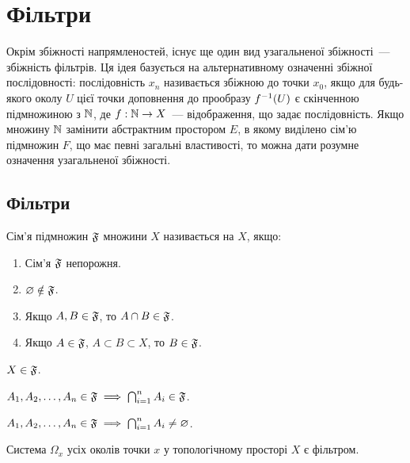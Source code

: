\chapter{Фільтри}

Окрім збіжності напрямленостей, існує ще один вид узагальненої збіжності~--- збіжність фільтрів. Ця ідея базується на альтернативному означенні збіжної послідовності: послідовність $x_n$ називається збіжною до точки $x_0$, якщо для будь-якого околу $U$ цієї точки доповнення до прообразу $f\inv (U)$ є скінченною підмножиною з $\NN$, де $f: \NN \to X$~--- відображення, що задає послідовність. Якщо множину $\NN$ замінити абстрактним простором $E$, в якому виділено сім'ю підмножин $F$, що має певні загальні властивості, то можна дати розумне означення узагальненої збіжності.

\section{Фільтри}

\begin{definition}
    Сім'я підмножин $\frak F$ множини $X$ називається  на $X$, якщо:
    \begin{enumerate}
        \item Сім'я $\frak F$ непорожня.
        \item $\emptyset \notin \frak F$.
        \item Якщо $A, B \in \frak F$, то $A \cap B \in \frak F$.
        \item Якщо $A \in \frak F$, $A \subset B \subset X$, то $B \in \frak F$.
    \end{enumerate}
\end{definition}

\begin{corollary}
    $X \in \frak F$.
\end{corollary}

\begin{corollary}
    $A_1, A_2, \dots, A_n \in \frak F \implies \bigcap_{i = 1}^n A_i \in \frak F$.
\end{corollary}

\begin{corollary}
    $A_1, A_2, \dots, A_n \in \frak F \implies \bigcap_{i = 1}^n A_i \ne \emptyset$.
\end{corollary}

\begin{example}
    Система $\Omega_x$ усіх околів точки $x$ у топологічному просторі $X$ є фільтром.
\end{example}

